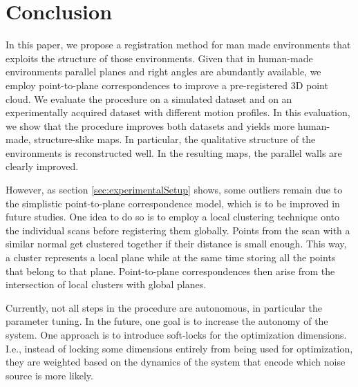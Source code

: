 \section{Conclusion}

In this paper, we propose a registration method for man made environments that exploits the structure of those environments. 
Given that in human-made environments parallel planes and right angles are abundantly available, we employ point-to-plane correspondences to improve a pre-registered 3D point cloud. 
We evaluate the procedure on a simulated dataset and on an experimentally acquired dataset with different motion profiles. 
In this evaluation, we show that the procedure improves both datasets and yields more human-made, structure-slike maps. 
In particular, the qualitative structure of the environments is reconstructed well. 
In the resulting maps, the parallel walls are clearly improved.

However, as section \ref{sec:experimentalSetup} shows, some outliers remain due to the simplistic point-to-plane correspondence model, which is to be improved in future studies.
One idea to do so is to employ a local clustering technique onto the individual scans before registering them globally. 
Points from the scan with a similar normal get clustered together if their distance is small enough.
This way, a cluster represents a local plane while at the same time storing all the points that belong to that plane.
Point-to-plane correspondences then arise from the intersection of local clusters with global planes.

Currently, not all steps in the procedure are autonomous, in particular the parameter tuning. 
In the future, one goal is to increase the autonomy of the system.
One approach is to introduce soft-locks for the optimization dimensions.
I.e., instead of locking some dimensions entirely from being used for optimization, they are weighted based on the dynamics of the system that encode which noise source is more likely.  

